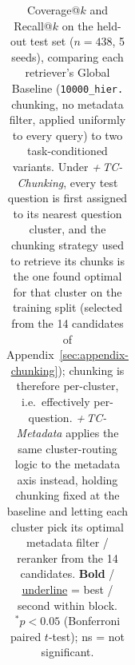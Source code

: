 \begin{table}[htbp]
{\begin{tabular}{ll cc cc}
\bottomrule
\end{tabular}
}
\caption{Coverage@$k$ and Recall@$k$ on the held-out test set
($n{=}438$, 5 seeds), comparing each retriever's Global Baseline
(\texttt{10000\_hier.} chunking, no metadata filter, applied uniformly
to every query) to two task-conditioned variants. Under
\textit{+\,TC-Chunking}, every test question is first assigned to its
nearest question cluster, and the chunking strategy used to retrieve
its chunks is the one found optimal for that cluster on the training
split (selected from the 14 candidates of
Appendix~\ref{sec:appendix-chunking}); chunking is therefore
per-cluster, i.e.\ effectively per-question. \textit{+\,TC-Metadata}
applies the same cluster-routing logic to the metadata axis instead,
holding chunking fixed at the baseline and letting each cluster pick
its optimal metadata filter / reranker from the
14 candidates. \textbf{Bold} / \uline{underline} = best / second within block.
$^{*}p<0.05$ (Bonferroni paired $t$-test); ns = not significant.}
\label{tab:tc-inference-merged}
\end{table}